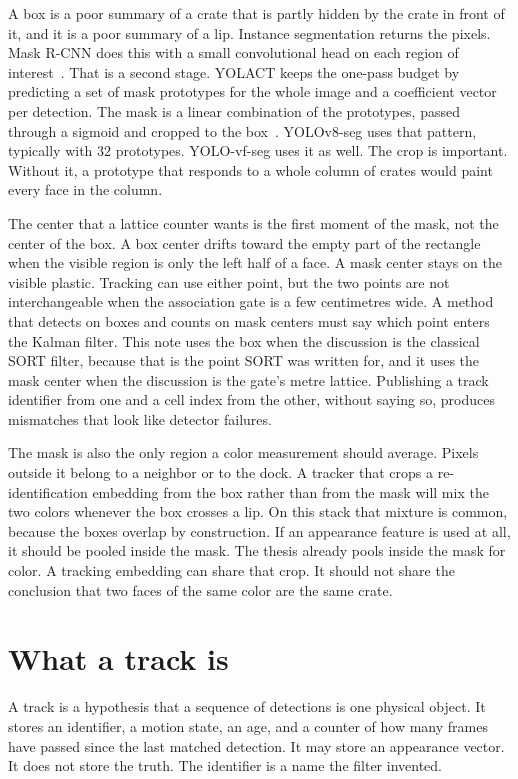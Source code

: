 \documentclass[11pt,a4paper]{article}
\begin{document}
A box is a poor summary of a crate that is partly hidden by the crate in front of it, and it is a poor summary of a lip. Instance segmentation returns the pixels. Mask R-CNN does this with a small convolutional head on each region of interest~\cite{he2017mask}. That is a second stage. YOLACT keeps the one-pass budget by predicting a set of mask prototypes for the whole image and a coefficient vector per detection. The mask is a linear combination of the prototypes, passed through a sigmoid and cropped to the box~\cite{bolya2019yolact}. YOLOv8-seg uses that pattern, typically with $32$ prototypes. YOLO-vf-seg uses it as well. The crop is important. Without it, a prototype that responds to a whole column of crates would paint every face in the column.

The center that a lattice counter wants is the first moment of the mask, not the center of the box. A box center drifts toward the empty part of the rectangle when the visible region is only the left half of a face. A mask center stays on the visible plastic. Tracking can use either point, but the two points are not interchangeable when the association gate is a few centimetres wide. A method that detects on boxes and counts on mask centers must say which point enters the Kalman filter. This note uses the box when the discussion is the classical SORT filter, because that is the point SORT was written for, and it uses the mask center when the discussion is the gate's metre lattice. Publishing a track identifier from one and a cell index from the other, without saying so, produces mismatches that look like detector failures.

The mask is also the only region a color measurement should average. Pixels outside it belong to a neighbor or to the dock. A tracker that crops a re-identification embedding from the box rather than from the mask will mix the two colors whenever the box crosses a lip. On this stack that mixture is common, because the boxes overlap by construction. If an appearance feature is used at all, it should be pooled inside the mask. The thesis already pools inside the mask for color. A tracking embedding can share that crop. It should not share the conclusion that two faces of the same color are the same crate.

\section{What a track is}
\label{sec:track}

A track is a hypothesis that a sequence of detections is one physical object. It stores an identifier, a motion state, an age, and a counter of how many frames have passed since the last matched detection. It may store an appearance vector. It does not store the truth. The identifier is a name the filter invented.
\end{document}
